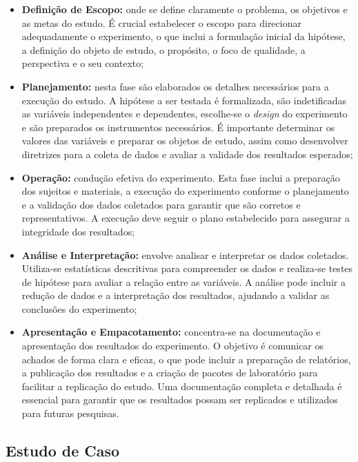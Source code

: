 \begin{itemize}
    \item \textbf{Definição de Escopo:} onde se define claramente o problema, os objetivos e as metas do estudo. É crucial estabelecer o escopo para direcionar adequadamente o experimento, o que inclui a formulação inicial da hipótese, a definição do objeto de estudo, o propósito, o foco de qualidade, a perspectiva e o seu contexto;
    \item \textbf{Planejamento:} nesta fase são elaborados os detalhes necessários para a execução do estudo. A hipótese a ser testada é formalizada, são indetificadas as variáveis independentes e dependentes, escolhe-se o \textit{design} do experimento e são preparados os instrumentos necessários. É importante determinar os valores das variáveis e preparar os objetos de estudo, assim como desenvolver diretrizes para a coleta de dados e avaliar a validade dos resultados esperados;
    \item \textbf{Operação:} condução efetiva do experimento. Esta fase inclui a preparação dos sujeitos e materiais, a execução do experimento conforme o planejamento e a validação dos dados coletados para garantir que são corretos e representativos. A execução deve seguir o plano estabelecido para assegurar a integridade dos resultados;
    \item \textbf{Análise e Interpretação:} envolve analisar e interpretar os dados coletados. Utiliza-se estatísticas descritivas para compreender os dados e realiza-se testes de hipótese para avaliar a relação entre as variáveis. A análise pode incluir a redução de dados e a interpretação dos resultados, ajudando a validar as conclusões do experimento;
    \item \textbf{Apresentação e Empacotamento:} concentra-se na documentação e apresentação dos resultados do experimento. O objetivo é comunicar os achados de forma clara e eficaz, o que pode incluir a preparação de relatórios, a publicação dos resultados e a criação de pacotes de laboratório para facilitar a replicação do estudo. Uma documentação completa e detalhada é essencial para garantir que os resultados possam ser replicados e utilizados para futuras pesquisas.
\end{itemize}


\subsection{Estudo de Caso}
\label{subsec:case-study}

